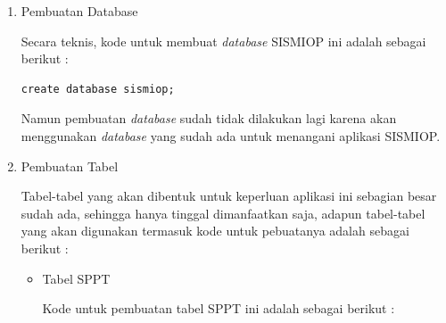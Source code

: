 \documentclass[pdftex,12pt, oneside]{article}
\begin{document}
\begin{enumerate}[1.]
	\item Pembuatan Database
	
	Secara teknis, kode untuk membuat \textit{database} SISMIOP ini adalah sebagai berikut :
	
	\begin{lstlisting}
create database sismiop;
	\end{lstlisting}
	
	Namun pembuatan \textit{database} sudah tidak dilakukan lagi karena akan menggunakan \textit{database} yang sudah ada untuk menangani aplikasi SISMIOP.
	
	\item Pembuatan Tabel
	
	Tabel-tabel yang akan dibentuk untuk keperluan aplikasi ini sebagian besar sudah ada, sehingga hanya tinggal dimanfaatkan saja, adapun tabel-tabel yang akan digunakan termasuk kode untuk pebuatanya adalah sebagai berikut :
	
	\begin{itemize}
	\item Tabel SPPT
	
	Kode untuk pembuatan tabel SPPT ini adalah sebagai berikut :
	

\end{itemize}
\end{enumerate}
\end{document}
